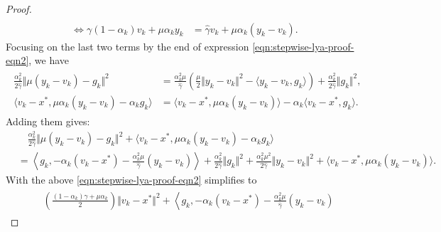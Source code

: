 \documentclass[12pt]{article}
\begin{document}
\begin{proof}
\begin{align*}
            \\
            \iff 
            \gamma(1 - \alpha_k) v_k + \mu \alpha_k y_k
            &= 
            \hat \gamma v_k + \mu \alpha_k(y_k - v_k). 
        \end{align*}
        Focusing on the last two terms by the end of expression \eqref{eqn:stepwise-lya-proof-eqn2}, we have  
        \begin{align}
         \label{eqn:stepwise-lya-proof-eqn2.1}
        \begin{split}
            \frac{\alpha^2_k}{2\hat \gamma} 
            \Vert \mu(y_k - v_k) - g_k\Vert^2
            & = 
            \frac{\alpha_k^2\mu}{\hat \gamma}
            \left(
                \frac{\mu}{2}\Vert y_k - v_k\Vert^2 
                - \langle y_k - v_k, g_k\rangle
            \right)
            + \frac{\alpha_k^2}{2\hat \gamma}\Vert g_k\Vert^2, 
            \\
            \langle v_k - x^*, \mu \alpha_k(y_k - v_k) - \alpha_k g_k\rangle
            &= 
            \langle v_k - x^*, \mu\alpha_k(y_k - v_k)\rangle 
            - \alpha_k \langle v_k - x^*, g_k\rangle. 
        \end{split} %
        \end{align}
        Adding them gives: 
        {\small
        \begin{align*}
            & \quad 
            \frac{\alpha^2_k}{2\hat \gamma} 
            \Vert \mu(y_k - v_k) - g_k\Vert^2
            + 
            \langle v_k - x^*, \mu \alpha_k(y_k - v_k) - \alpha_k g_k\rangle
            \\
            &= 
            \left\langle g_k, 
                - \alpha_k(v_k - x^*) 
                - \frac{\alpha_k^2\mu}{\hat \gamma}(y_k - v_k)
            \right\rangle
            + \frac{\alpha_k^2}{2\hat \gamma}\Vert g_k\Vert^2
            + \frac{\alpha_k^2 \mu^2}{2\hat \gamma}\Vert y_k - v_k\Vert^2
            + \langle v_k - x^*, \mu\alpha_k(y_k - v_k)\rangle. 
        \end{align*}
        }
        With the above \eqref{eqn:stepwise-lya-proof-eqn2} simplifies to 
        {\small
        \begin{align}\label{expr:stepwise-lya-expr2.2}
        \begin{split}
            & 
            \left(
            \frac{(1 - \alpha_k)\gamma + \mu \alpha_k}{2} 
            \right)\Vert v_k - x^*\Vert^2
            + 
            \left\langle g_k, 
                - \alpha_k(v_k - x^*) 
                - \frac{\alpha_k^2\mu}{\hat \gamma}(y_k - v_k)

\end{split}
\end{align}}
\end{proof}
\end{document}
